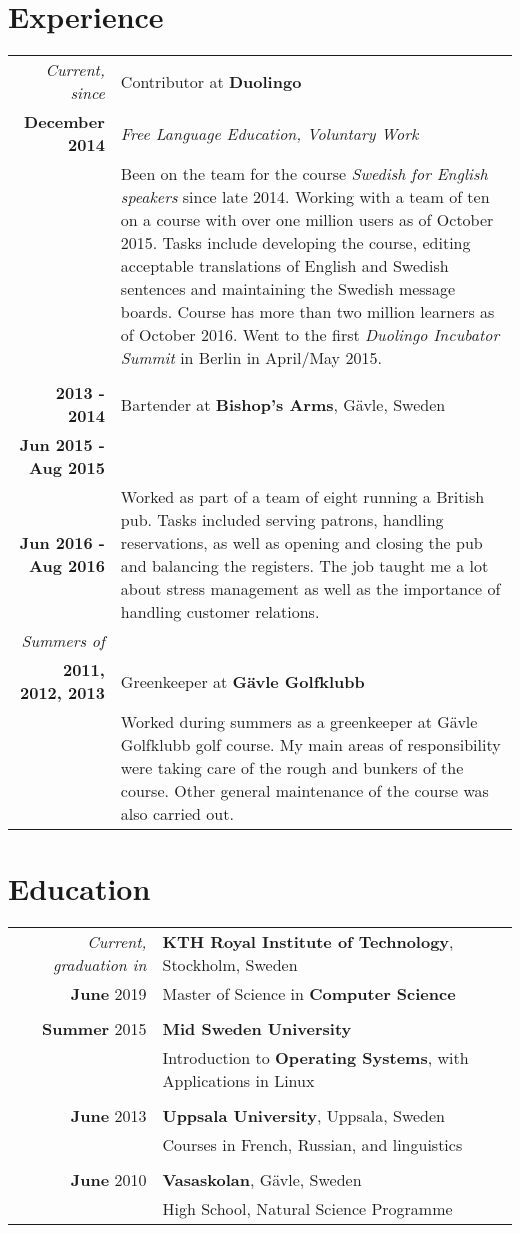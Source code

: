 \documentclass[a4paper,10pt]{article}
\begin{document}
\section{Experience}
\begin{tabular}{r|p{11cm}}
 \emph{Current, since} & Contributor at \textbf{Duolingo}\\\textbf{December 2014}&\emph{Free Language Education, Voluntary Work}\\&\footnotesize{Been on the team for the course \emph{Swedish for English speakers} since late 2014. Working with a team of ten on a course with over one million users as
 of October 2015. Tasks include developing the course, editing acceptable translations of English
 and Swedish sentences and maintaining the Swedish message boards. Course has more than two million learners as of October 2016. Went to the first \emph{Duolingo Incubator Summit} in Berlin in April/May 2015.}\\ \\
\textbf{2013 - 2014} & Bartender at \textbf{Bishop's Arms}, Gävle, Sweden \\ \textbf{Jun 2015 - Aug 2015} \\ \textbf{Jun 2016 - Aug 2016}&\footnotesize{Worked as part of a team of eight running a British pub. Tasks included serving patrons, handling reservations, as well as opening and closing the pub and balancing the registers. The job taught me a lot about stress management as well as the importance of handling customer relations.}\\
\emph{Summers of}\\\textbf{2011, 2012, 2013} & Greenkeeper at \textbf{Gävle Golfklubb} \\
&\footnotesize{Worked during summers as a greenkeeper at Gävle Golfklubb golf course. My main areas of responsibility were taking care of the rough and bunkers of the course. Other general maintenance of the course was also carried out.}
\end{tabular}

\section{Education}
\begin{tabular}{rl}
\emph{Current, graduation in} & \textbf{KTH Royal Institute of Technology}, Stockholm, Sweden\\	
 \textbf{June} 2019 & Master of Science in \textbf{Computer Science}\\&\\
\textbf{Summer} 2015& \textbf{Mid Sweden University}\\& Introduction to \textbf{Operating Systems}, with Applications in Linux\\&\\
\textbf{June} 2013& \textbf{Uppsala University}, Uppsala, Sweden\\& Courses in French, Russian, and linguistics\\&\\
\textbf{June} 2010& \textbf{Vasaskolan}, Gävle, Sweden \\& High School, Natural Science Programme
\end{tabular}
\end{document}
